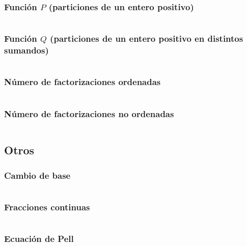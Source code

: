 \documentclass[11pt]{article}
\begin{document}
			\subsubsection{Función $P$ (particiones de un entero positivo)}
			\inputminted[tabsize=2,breaklines,firstline=544,lastline=576,fontsize=\small]{c++}{numberTheory.cpp}
			
			\subsubsection{Función $Q$ (particiones de un entero positivo en distintos sumandos)}
			\inputminted[tabsize=2,breaklines,firstline=578,lastline=629,fontsize=\small]{c++}{numberTheory.cpp}
			
			\subsubsection{Número de factorizaciones ordenadas}
			\inputminted[tabsize=2,breaklines,firstline=778,lastline=806,fontsize=\small]{c++}{numberTheory.cpp}
			
			\subsubsection{Número de factorizaciones no ordenadas}
			\inputminted[tabsize=2,breaklines,firstline=808,lastline=834,fontsize=\small]{c++}{numberTheory.cpp}
			
		\subsection{Otros}
			\subsubsection{Cambio de base}
			\inputminted[tabsize=2,breaklines,firstline=460,lastline=487,fontsize=\small]{c++}{numberTheory.cpp}
			
			\subsubsection{Fracciones continuas}
			\inputminted[tabsize=2,breaklines,firstline=631,lastline=671,fontsize=\small]{c++}{numberTheory.cpp}
			
			\subsubsection{Ecuación de Pell}
			\inputminted[tabsize=2,breaklines,firstline=673,lastline=686,fontsize=\small]{c++}{numberTheory.cpp}
			
\end{document}
